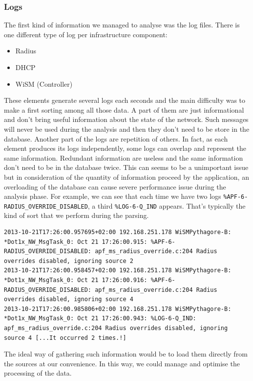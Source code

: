 \subsubsection{Logs}
The first kind of information we managed to analyse was the log files. There is one different type of log per infrastructure component:
\begin{itemize}
\item Radius
\item DHCP
\item WiSM (Controller)
\end{itemize}
These elements generate several logs each seconds and the main difficulty was to make a first sorting among all those data. A part of them are just informational and don't bring useful information about the state of the network. Such messages will never be used during the analysis and then they don't need to be store in the database. Another part of the logs are repetition of others. In fact, as each element produces its logs independently, some logs can overlap and represent the same information. Redundant information are useless and the same information don't need to be in the database twice. This can seems to be a unimportant issue but in consideration of the quantity of information proceed by the application, an overloading of the database can cause severe performance issue during the analysis phase. For example, we can see that each time we have two logs \texttt{\%APF-6-RADIUS\_OVERRIDE\_DISABLED}, a third \texttt{\%LOG-6-Q\_IND} appears. That's typically the kind of sort that we perform during the parsing.\\

\begin{lstlisting}[frame=single,breaklines=true,caption={Example of useless WiSM logs}]
2013-10-21T17:26:00.957695+02:00 192.168.251.178 WiSMPythagore-B: *Dot1x_NW_MsgTask_0: Oct 21 17:26:00.915: %APF-6-RADIUS_OVERRIDE_DISABLED: apf_ms_radius_override.c:204 Radius overrides disabled, ignoring source 2 
2013-10-21T17:26:00.958457+02:00 192.168.251.178 WiSMPythagore-B: *Dot1x_NW_MsgTask_0: Oct 21 17:26:00.916: %APF-6-RADIUS_OVERRIDE_DISABLED: apf_ms_radius_override.c:204 Radius overrides disabled, ignoring source 4 
2013-10-21T17:26:00.985806+02:00 192.168.251.178 WiSMPythagore-B: *Dot1x_NW_MsgTask_0: Oct 21 17:26:00.943: %LOG-6-Q_IND: apf_ms_radius_override.c:204 Radius overrides disabled, ignoring source 4 [...It occurred 2 times.!]
\end{lstlisting}


The ideal way of gathering such information would be to load them directly from the sources at our convenience. In this way, we could manage and optimise the processing of the data.

